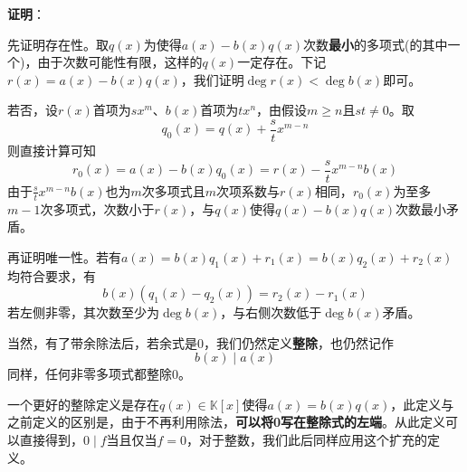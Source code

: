 \documentclass[a4paper,UTF8,fontset=windows,AutoFakeBold]{ctexart}
\newcommand*{\note}{\noindent *}
\newcommand{\proo}[1]{{\vspace{5pt}\kaishu\noindent\textbf{证明}：\vspace{-3pt}
\begin{compactitem}
    \item[] #1
\end{compactitem}
}}
\begin{document}
\proo{
    先证明存在性。取$q(x)$为使得$a(x)-b(x)q(x)$次数\textbf{最小}的多项式(的其中一个)，由于次数可能性有限，这样的$q(x)$一定存在。下记$r(x)=a(x)-b(x)q(x)$，我们证明$\deg r(x)<\deg b(x)$即可。
    
    若否，设$r(x)$首项为$sx^m$、$b(x)$首项为$tx^n$，由假设$m\ge n$且$st\ne0$。取
    $$q_0(x)=q(x)+\frac{s}{t}x^{m-n}$$
    则直接计算可知
    $$r_0(x)=a(x)-b(x)q_0(x)=r(x)-\frac{s}{t}x^{m-n}b(x)$$
    由于$\frac{s}{t}x^{m-n}b(x)$也为$m$次多项式且$m$次项系数与$r(x)$相同，$r_0(x)$为至多$m-1$次多项式，次数小于$r(x)$，与$q(x)$使得$q(x)-b(x)q(x)$次数最小矛盾。

    再证明唯一性。若有$a(x)=b(x)q_1(x)+r_1(x)=b(x)q_2(x)+r_2(x)$均符合要求，有
    $$b(x)(q_1(x)-q_2(x))=r_2(x)-r_1(x)$$
    若左侧非零，其次数至少为$\deg b(x)$，与右侧次数低于$\deg b(x)$矛盾。
}

当然，有了带余除法后，若余式是0，我们仍然定义\textbf{整除}，也仍然记作
$$b(x)\mid a(x)$$
同样，任何非零多项式都整除0。

\note 一个更好的整除定义是存在$q(x)\in\mathbb{K}[x]$使得$a(x)=b(x)q(x)$，此定义与之前定义的区别是，由于不再利用除法，\textbf{可以将0写在整除式的左端}。从此定义可以直接得到，$0\mid f$当且仅当$f=0$，对于整数，我们此后同样应用这个扩充的定义。
\end{document}
